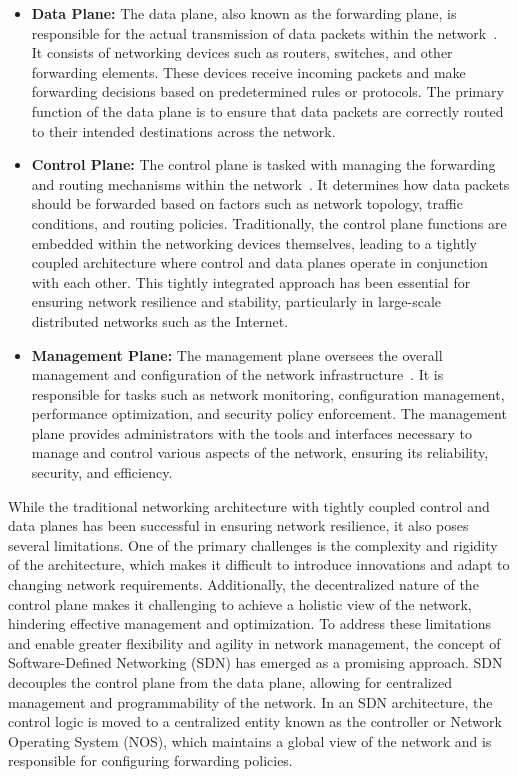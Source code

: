 \begin{itemize}
\item  \textbf{Data Plane:} The data plane, also known as the forwarding plane, is responsible for the actual transmission of data packets within the network~\cite{tr2016sdn}. It consists of networking devices such as routers, switches, and other forwarding elements. These devices receive incoming packets and make forwarding decisions based on predetermined rules or protocols. The primary function of the data plane is to ensure that data packets are correctly routed to their intended destinations across the network.
\item  \textbf{Control Plane:} The control plane is tasked with managing the forwarding and routing mechanisms within the network~\cite{tr2016sdn}. It determines how data packets should be forwarded based on factors such as network topology, traffic conditions, and routing policies. Traditionally, the control plane functions are embedded within the networking devices themselves, leading to a tightly coupled architecture where control and data planes operate in conjunction with each other. This tightly integrated approach has been essential for ensuring network resilience and stability, particularly in large-scale distributed networks such as the Internet.
\item \textbf{Management Plane:} The management plane oversees the overall management and configuration of the network infrastructure~\cite{tr2016sdn}. It is responsible for tasks such as network monitoring, configuration management, performance optimization, and security policy enforcement. The management plane provides administrators with the tools and interfaces necessary to manage and control various aspects of the network, ensuring its reliability, security, and efficiency.
\end{itemize}

While the traditional networking architecture with tightly coupled control and data planes has been successful in ensuring network resilience, it also poses several limitations. One of the primary challenges is the complexity and rigidity of the architecture, which makes it difficult to introduce innovations and adapt to changing network requirements. Additionally, the decentralized nature of the control plane makes it challenging to achieve a holistic view of the network, hindering effective management and optimization.
To address these limitations and enable greater flexibility and agility in network management, the concept of Software-Defined Networking (SDN) has emerged as a promising approach. SDN decouples the control plane from the data plane, allowing for centralized management and programmability of the network. In an SDN architecture, the control logic is moved to a centralized entity known as the controller or Network Operating System (NOS), which maintains a global view of the network and is responsible for configuring forwarding policies.

